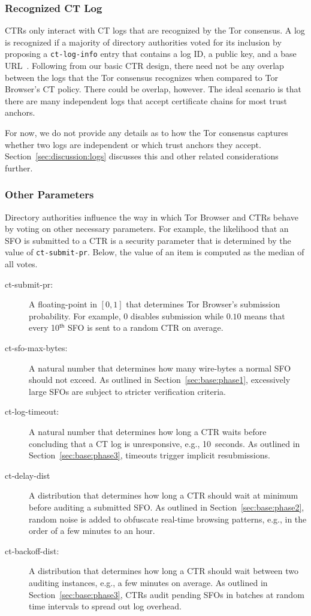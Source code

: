 \subsubsection{Recognized CT Log} \label{sec:base:consensus:log}
CTRs only interact with CT logs that are recognized by the Tor consensus.  A log
is recognized if a majority of directory authorities voted for its inclusion by
proposing a \texttt{ct-log-info} entry that contains a log ID, a public key, and
a base URL~\cite{ct,ct/bis}. 
Following from our basic CTR design, there need not be any overlap between the
logs that the Tor consensus recognizes when compared to Tor Browser's CT policy.
There could be overlap, however.  The ideal scenario is that there are many
independent logs that accept certificate chains for most trust anchors.

For now, we do not provide any details as to how the Tor consensus captures
whether two logs are independent or which trust anchors they accept.
Section~\ref{sec:discussion:logs} discusses this and other related
considerations further.

\subsubsection{Other Parameters} \label{sec:base:consensus:params}
Directory authorities influence the way in which Tor Browser and CTRs behave by
voting on other necessary parameters.  For example, the likelihood that
an SFO is submitted to a CTR is a security parameter that is determined by the
value of \texttt{ct-submit-pr}.  Below, the value of an item is computed as the
median of all votes.
\begin{description}
	\item[ct-submit-pr:] A floating-point in $[0,1]$ that determines Tor
		Browser's submission probability.  For example, $0$ disables submission
		while $0.10$ means that every 10$^{\mathsf{th}}$ SFO is sent to a
		random CTR on average.
	\item[ct-sfo-max-bytes:] A natural number that determines how many
		wire-bytes a normal SFO should not exceed.  As outlined in
		Section~\ref{sec:base:phase1}, excessively large SFOs are subject
		to stricter verification criteria.
	\item[ct-log-timeout:] A natural number that determines how long a CTR
		waits before concluding that a CT log is unresponsive, e.g., 10~seconds.
		As outlined in Section~\ref{sec:base:phase3}, timeouts trigger implicit
		resubmissions.
	\item[ct-delay-dist] A distribution that determines how long a CTR should
		wait at minimum before auditing a submitted SFO.  As outlined in
		Section~\ref{sec:base:phase2}, random noise is added to obfuscate
		real-time browsing patterns, e.g., in the order of a few minutes to an
		hour.
	\item[ct-backoff-dist:]
		A distribution that determines how long a CTR should wait between two
		auditing instances, e.g., a few minutes on average.  As outlined in
		Section~\ref{sec:base:phase3}, CTRs audit pending SFOs in batches at
		random time intervals to spread out log overhead.
\end{description}

